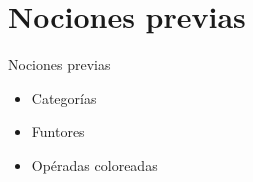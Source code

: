 \documentclass[12pt,aspectratio=169]{beamer}
\numberwithin{equation}{section}
\theoremstyle{definition}
\newtheorem{defi}[teo]{Definici\'on}
\begin{document}
{
\section{Nociones previas}
\begin{frame}{Nociones previas}
    \begin{itemize}
        \item Categor\'ias
        \item Funtores
        \item Op\'eradas coloreadas
    \end{itemize}
\end{frame}


}
\end{document}
